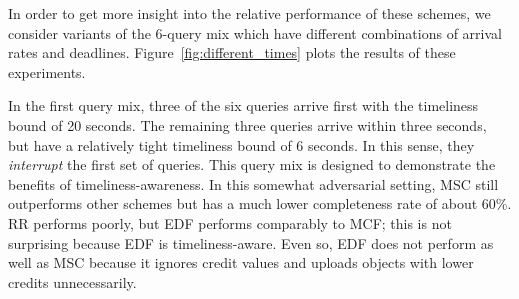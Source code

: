 %

In order to get more insight into the relative performance of these
schemes, we consider variants of the 6-query mix which have different
combinations of arrival rates and deadlines.
%
Figure~\ref{fig:different_times} plots the results of these experiments.

In the first query mix, three of the six queries arrive first with the
timeliness bound of 20 seconds.
%
The remaining three queries arrive within three seconds, but have a
relatively tight timeliness bound of 6 seconds.
%
In this sense, they \emph{interrupt} the first set of queries.
%
This query mix is designed to demonstrate the benefits of
timeliness-awareness.
%
In this somewhat adversarial setting, MSC still outperforms other
schemes but has a much lower completeness rate of about
60\%. %
%
RR performs poorly, but EDF performs comparably to MCF; this is not
surprising because EDF is timeliness-aware.
%
Even so, EDF does not perform as well as MSC because it ignores credit
values and uploads objects with lower credits unnecessarily.


